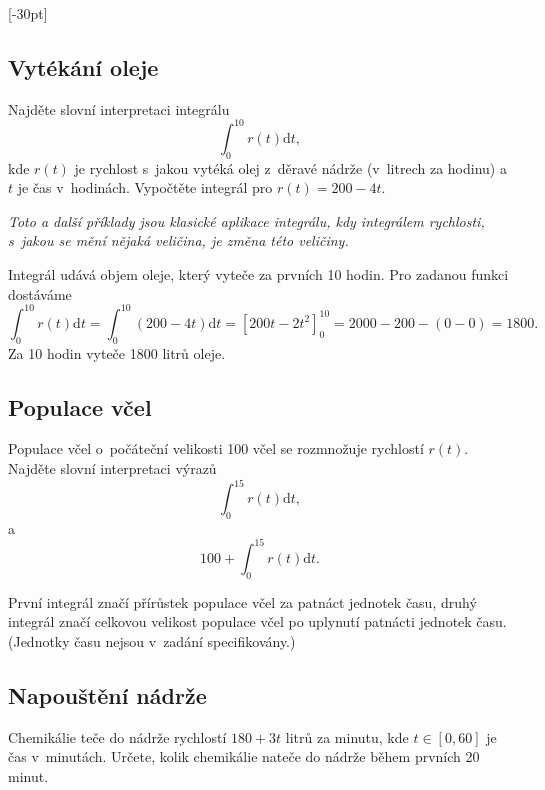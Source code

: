 \konec


\stranka

[-30pt]

\subsection{Vytékání oleje} Najděte slovní interpretaci integrálu
\begin{equation*}
  \int_0^{10} r(t)\mathrm dt,
\end{equation*}
kde $r(t)$ je rychlost s~jakou vytéká olej z~děravé nádrže (v~litrech
za hodinu) a $t$ je čas v~hodinách. Vypočtěte integrál pro $r(t)=200-4t$.

\textit{Toto a další příklady jsou klasické aplikace integrálu, kdy integrálem rychlosti, s jakou se mění nějaká veličina, je změna této veličiny.}

\reseni Integrál udává objem oleje, který vyteče za prvních 10 hodin. Pro zadanou funkci dostáváme
\begin{equation*}
    \int_0^{10}r(t)\mathrm{d}t= \int_0^{10}(200-4t)\mathrm{d}t=
    \left[200t-2t^2\right]_0^{10}= 2000-200-(0-0)=1800.
  \end{equation*}
  Za 10 hodin vyteče 1800 litrů oleje.
\konec


\subsection{Populace včel}
 Populace včel o~počáteční velikosti 100 včel se rozmnožuje rychlostí $r(t)$. Najděte slovní interpretaci výrazů
\begin{equation*}
  \int_0^{15} r(t)\mathrm dt,
\end{equation*}
a
\begin{equation*}
  100+\int_0^{15} r(t)\mathrm dt.
\end{equation*}


\reseni První integrál značí přírůstek populace včel za patnáct jednotek času, druhý integrál značí celkovou velikost populace včel po uplynutí patnácti jednotek času. (Jednotky času nejsou v zadání specifikovány.)
\konec


\subsection{Napouštění nádrže} Chemikálie teče do nádrže rychlostí
$180+3t$ litrů za minutu, kde $t\in [0,60]$ je čas v~minutách. Určete, kolik chemikálie
nateče do nádrže během prvních 20 minut.

